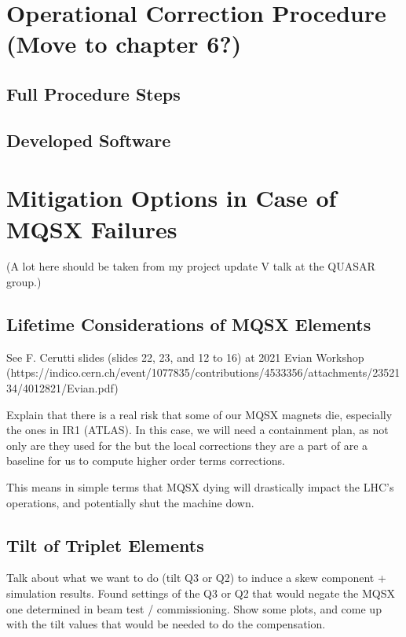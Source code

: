 \section{Operational Correction Procedure (Move to chapter 6?)}

\subsection{Full Procedure Steps}

\subsection{Developed Software}


\section{Mitigation Options in Case of MQSX Failures}

(A lot here should be taken from my project update V talk at the QUASAR group.)

\subsection{Lifetime Considerations of MQSX Elements}

See F. Cerutti slides (slides 22, 23, and 12 to 16) at 2021 Evian Workshop
(https://indico.cern.ch/event/1077835/contributions/4533356/attachments/2352134/4012821/Evian.pdf)

Explain that there is a real risk that some of our MQSX magnets die, especially the ones in IR1 (ATLAS).
In this case, we will need a containment plan, as not only are they used for the but the local corrections they are a part of are a baseline for us to compute higher order terms corrections.


This means in simple terms that MQSX dying will drastically impact the LHC's operations, and potentially shut the machine down.

\subsection{Tilt of Triplet Elements}

Talk about what we want to do (tilt Q3 or Q2) to induce a skew component + simulation results.
Found settings of the Q3 or Q2 that would negate the MQSX one determined in beam test / commissioning.
Show some plots, and come up with the tilt values that would be needed to do the compensation.

